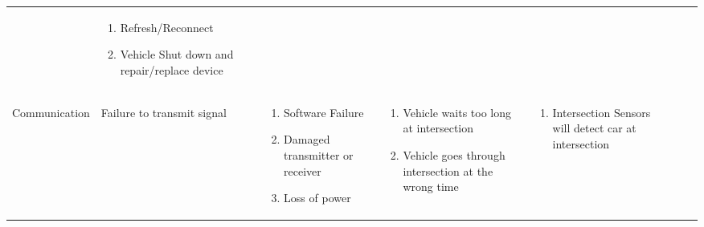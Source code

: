 \documentclass [10pt]{article}
\begin{document}
{\begin{minipage}{\textwidth}
\begin{longtable}{ |p{ }  | p{ } |  p{ } |  p{ } | p{ } | p{ } |  p{ }|}
    
    & \cellcolor{tableCell}\begin{minipage}{.24 \columnwidth} 
                \vspace{2mm}
                \begin{enumerate}
                    \item Refresh/Reconnect 
                    \item Vehicle Shut down and repair/replace device\vspace {1mm}
                \end{enumerate}
        \end{minipage} \\ \cline{2-7}
    
    \multirow{-5}{*}{\begin{minipage} {.12\columnwidth}
    \begin{center} \small Communication \end{center}
    \end{minipage}\cellcolor{subsectionC} }
    & \begin{minipage} {.19\columnwidth}
            \begin{center} Failure to transmit signal \end{center}
        \end{minipage} 
    & \begin{minipage}{.22\textwidth} 
                \begin{enumerate}
                    \item Software Failure
                    \item Damaged transmitter or receiver 
                    \item Loss of power\vspace {1mm}
                \end{enumerate}
        \end{minipage}
    & \begin{minipage}{.22\textwidth} 
                \vspace{2mm}
                \begin{enumerate}
                    \item Vehicle waits too long at intersection
                    \item Vehicle goes through intersection at the wrong time\vspace {1mm}
                \end{enumerate}
        \end{minipage}
    & \begin{minipage}{.18\textwidth} 
                \begin{enumerate}
                    \item Intersection Sensors will detect car at intersection \vspace {1mm}
                \end{enumerate}
        \end{minipage}
    & 
    

\end{longtable}
\end{minipage}}
\end{document}
